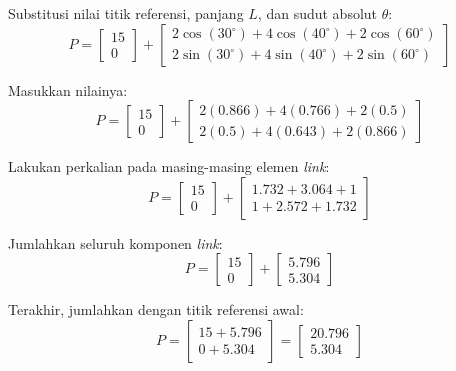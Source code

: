 \documentclass[12pt, a4paper, bahasa]{article}
\begin{document}
Substitusi nilai titik referensi, panjang $L$, dan sudut absolut $\theta$:
\begin{equation}
P = \begin{bmatrix} 15 \\ 0 \end{bmatrix} + 
\begin{bmatrix} 
2 \cos(30^\circ) + 4 \cos(40^\circ) + 2 \cos(60^\circ) \\ 
2 \sin(30^\circ) + 4 \sin(40^\circ) + 2 \sin(60^\circ) 
\end{bmatrix}
\end{equation}

Masukkan nilainya:
\begin{equation}
P = \begin{bmatrix} 15 \\ 0 \end{bmatrix} + 
\begin{bmatrix} 
2(0.866) + 4(0.766) + 2(0.5) \\ 
2(0.5) + 4(0.643) + 2(0.866) 
\end{bmatrix}
\end{equation}

Lakukan perkalian pada masing-masing elemen \textit{link}:
\begin{equation}
P = \begin{bmatrix} 15 \\ 0 \end{bmatrix} + 
\begin{bmatrix} 
1.732 + 3.064 + 1 \\ 
1 + 2.572 + 1.732 
\end{bmatrix}
\end{equation}

Jumlahkan seluruh komponen \textit{link}:
\begin{equation}
P = \begin{bmatrix} 15 \\ 0 \end{bmatrix} + 
\begin{bmatrix} 
5.796 \\ 
5.304 
\end{bmatrix}
\end{equation}

Terakhir, jumlahkan dengan titik referensi awal:
\begin{equation}
P = \begin{bmatrix} 
15 + 5.796 \\ 
0 + 5.304 
\end{bmatrix} =
\begin{bmatrix} 
20.796 \\ 
5.304 
\end{bmatrix}
\end{equation}
\end{document}
